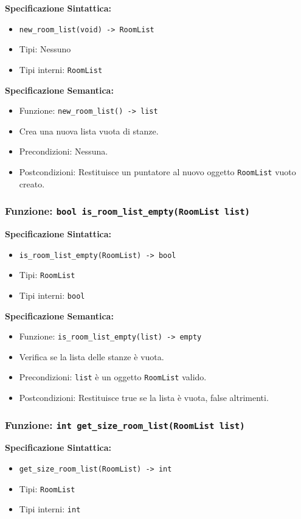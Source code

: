 \documentclass[11pt]{scrartcl} %
\begin{document}
\textbf{Specificazione Sintattica:}
\begin{itemize}
\item \texttt{new\_room\_list(void) -> RoomList}
\item Tipi: Nessuno
\item Tipi interni: \texttt{RoomList}
\end{itemize}

\textbf{Specificazione Semantica:}
\begin{itemize}
\item Funzione: \texttt{new\_room\_list() -> list}
\item Crea una nuova lista vuota di stanze.
\item Precondizioni: Nessuna.
\item Postcondizioni: Restituisce un puntatore al nuovo oggetto \texttt{RoomList} vuoto creato.
\end{itemize}

\subsubsection{Funzione: \texttt{bool is\_room\_list\_empty(RoomList list)}}

\textbf{Specificazione Sintattica:}
\begin{itemize}
\item \texttt{is\_room\_list\_empty(RoomList) -> bool}
\item Tipi: \texttt{RoomList}
\item Tipi interni: \texttt{bool}
\end{itemize}

\textbf{Specificazione Semantica:}
\begin{itemize}
\item Funzione: \texttt{is\_room\_list\_empty(list) -> empty}
\item Verifica se la lista delle stanze è vuota.
\item Precondizioni: \texttt{list} è un oggetto \texttt{RoomList} valido.
\item Postcondizioni: Restituisce true se la lista è vuota, false altrimenti.
\end{itemize}

\subsubsection{Funzione: \texttt{int get\_size\_room\_list(RoomList list)}}

\textbf{Specificazione Sintattica:}
\begin{itemize}
\item \texttt{get\_size\_room\_list(RoomList) -> int}
\item Tipi: \texttt{RoomList}
\item Tipi interni: \texttt{int}
\end{itemize}
\end{document}
